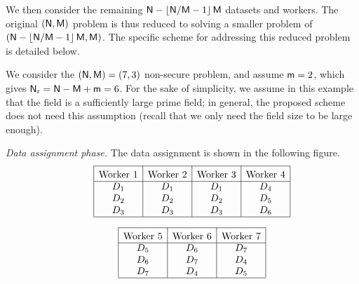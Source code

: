 \documentclass[conference,letterpaper]{IEEEtran}
\begin{document}
We then consider the remaining ${\sf N} - \left\lfloor {\sf N}/{\sf M} -1 \right\rfloor {\sf M}$ datasets and workers. The original $({\sf N}, {\sf M})$ problem is thus reduced to solving a smaller problem of $({\sf N} - \left\lfloor {\sf N}/{\sf M} -1 \right\rfloor {\sf M}, {\sf M})$. The specific scheme for addressing this reduced problem is detailed below.

\begin{example}\rm
 \label{ex:7,3}   
We consider the $({\sf N}, {\sf M}) = (7, 3)$ non-secure problem, and assume ${\sf m} = 2$, which gives ${\sf N}_{\rm r} = {\sf N} - {\sf M} + {\sf m} = 6$.
For the sake of simplicity, we assume in this example that the field is a sufficiently large prime field;  in general, the proposed scheme does not need this assumption (recall that we only need the field size to be large enough). 

{\it Data assignment phase.}
The data assignment is shown in the following figure.
\begin{align*}
\begin{array}{rl|c|c|c|c|}\cline{3-3}\cline{4-4}\cline{5-5}\cline{6-6}
&&\rule{0pt}{1.2em}\mbox{Worker 1} & \rule{0pt}{1.2em}\mbox{Worker 2} &  \rule{0pt}{1.2em}\mbox{Worker 3}&  \rule{0pt}{1.2em}\mbox{Worker 4}  \\ \cline{3-3}\cline{4-4}\cline{5-5}\cline{6-6}
&& D_1 & D_1 & D_1 & D_4  \\
&& D_2 & D_2 & D_2 & D_5  \\
&& D_3 & D_3 & D_3 & D_6  \\ \cline{3-3}\cline{4-4}\cline{5-5}\cline{6-6}
\end{array}
\end{align*}

\begin{align*}
\begin{array}{rl|c|c|c|}\cline{3-3}\cline{4-4}\cline{5-5}
&&\rule{0pt}{1.2em}\mbox{Worker 5} &  \rule{0pt}{1.2em}\mbox{Worker 6} &  \rule{0pt}{1.2em}\mbox{Worker 7}  \\ \cline{3-3}\cline{4-4}\cline{5-5}
&&  D_5 & D_6 & D_7 \\
&&  D_6 & D_7 & D_4 \\
&&  D_7 & D_4 & D_5 \\ \cline{3-3}\cline{4-4}\cline{5-5}
\end{array}
\end{align*}






\end{example}
\end{document}
